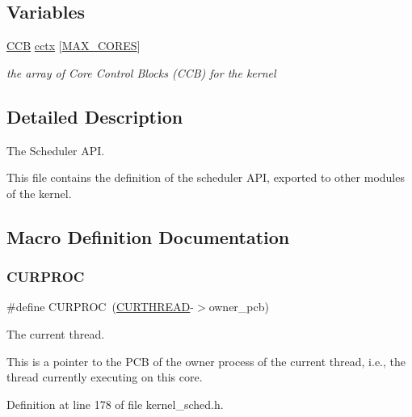 \subsection*{Variables}
\begin{DoxyCompactItemize}
\item 
\mbox{\label{group__scheduler_ga3be3b151b275926dff3fb99bee765eab}} 
\hyperlink{group__scheduler_ga7485b31e0dd9fd723bc2d75fba5206a0}{C\+CB} \hyperlink{group__scheduler_ga3be3b151b275926dff3fb99bee765eab}{cctx} \mbox{[}\hyperlink{bios_8h_a009855593b59738d24dbfc236edb3b14}{M\+A\+X\+\_\+\+C\+O\+R\+ES}\mbox{]}
\begin{DoxyCompactList}\small\item\em the array of Core Control Blocks (C\+CB) for the kernel \end{DoxyCompactList}\end{DoxyCompactItemize}


\subsection{Detailed Description}
The Scheduler A\+PI. 

This file contains the definition of the scheduler A\+PI, exported to other modules of the kernel. 

\subsection{Macro Definition Documentation}
\mbox{\label{group__scheduler_gae3437e8e6787ef05b6576d03c5b6a0ca}} 
\subsubsection{\texorpdfstring{C\+U\+R\+P\+R\+OC}{CURPROC}}
{\footnotesize\ttfamily \#define C\+U\+R\+P\+R\+OC~(\hyperlink{group__scheduler_ga587a82c8931f0df72f43cc913ceb7e27}{C\+U\+R\+T\+H\+R\+E\+AD}-\/$>$owner\+\_\+pcb)}



The current thread. 

This is a pointer to the P\+CB of the owner process of the current thread, i.\+e., the thread currently executing on this core. 

Definition at line 178 of file kernel\+\_\+sched.\+h.

